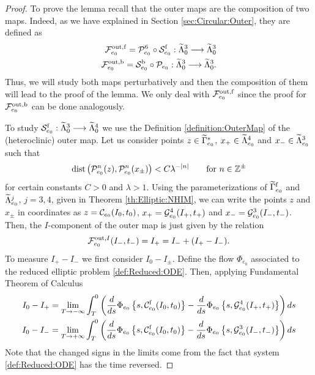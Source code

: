 \begin{proof}
  To prove the lemma recall that the outer maps are the composition of two maps. Indeed, as we have explained in Section \ref{sec:Circular:Outer}, they are defined as
\[
 \begin{split}
  \mathcal{F}_{e_0}^{\mathrm{out},\mathrm{f}}=\mathcal{P}_{e_0}^6\circ\mathcal{S}_{e_0}^{\mathrm{f}}: \widetilde\Lambda_0^3\longrightarrow \widetilde\Lambda_0^3\\
  \mathcal{F}_{e_0}^{\mathrm{out},\mathrm{b}}=\mathcal{S}_{e_0}^{\mathrm{b}}\circ\mathcal{P}_{e_0}: \widetilde\Lambda_0^3\longrightarrow \widetilde\Lambda_0^3.
 \end{split}
\]
Thus, we will study  both maps perturbatively and then the composition of them will lead to the proof of the lemma. We only deal with  $\mathcal{F}_{e_0}^{\mathrm{out},\mathrm{f}}$ since the proof for $\mathcal{F}_{e_0}^{\mathrm{out},\mathrm{b}}$ can be done analogously.

To study $\mathcal{S}_{e_0}^{\mathrm{f}}:\widetilde\Lambda_0^3\longrightarrow \widetilde\Lambda_0^4$  we use the Definition \ref{definition:OuterMap} of the (heteroclinic) outer map. Let us consider points $z\in\widetilde \Gamma^\ast_{e_0}$, $x_+\in \widetilde\Lambda^4_{e_0}$ and $x_-\in \widetilde\Lambda^3_{e_0}$ such that
  \[
  \mathrm{dist}\left(\mathcal{P}^n_{e_0}(z),\mathcal{P}^n_{e_0}(x_\pm)\right)<C\lambda^{-|n|}\qquad\text{for }n\in\mathbb{Z}^\pm
  \]
  for certain constants $C>0$ and $\lambda>1$. Using the parameterizations of $\widetilde\Gamma^{\mathrm{f}}_{e_0}$ and $\widetilde\Lambda^j_{e_0}$, $j=3,4$, given in Theorem \ref{th:Elliptic:NHIM}, we can write the points $z$ and $x_\pm$ in coordinates as $z=\mathcal{C}_{e_0}(I_0,t_0)$, $x_+=\mathcal{G}^4_{e_0}(I_+,t_+)$ and $x_-=\mathcal{G}^3_{e_0}(I_-,t_-)$. Then, the $I$-component of the outer map is just given by the relation
  \[
  \mathcal{F}_{e_0}^{\mathrm{out},I} (I_-,t_-)=I_+=I_-+(I_+-I_-).
  \]
  To measure $I_+-I_-$ we first consider $I_0-I_\pm$. Define the flow $\Phi_{e_0}$
  associated to the reduced elliptic problem \eqref{def:Reduced:ODE}. Then, applying
  Fundamental Theorem of Calculus
  \[
   \begin{split}
  I_0-I_+=\lim_{T\rightarrow-\infty}\int_T^0\left(\frac{d}{ds}\Phi_{e_0}\left\{s,\mathcal{C}^{\mathrm{f}}_{e_0}(I_0,t_0)\right\}-\frac{d}{ds}\Phi_{e_0}\left\{s,\mathcal{G}^4_{e_0}(I_+,t_+)\right\}\right)ds\\
  I_0-I_-=\lim_{T\rightarrow+\infty}\int_T^0\left(\frac{d}{ds}\Phi_{e_0}\left\{s,\mathcal{C}^{\mathrm{f}}_{e_0}(I_0,t_0)\right\}-\frac{d}{ds}\Phi_{e_0}\left\{s,\mathcal{G}^3_{e_0}(I_-,t_-)\right\}\right)ds
\end{split}
\]
  Note that the changed signs in the limits come from the fact that system \eqref{def:Reduced:ODE} has the time reversed.


\end{proof}
